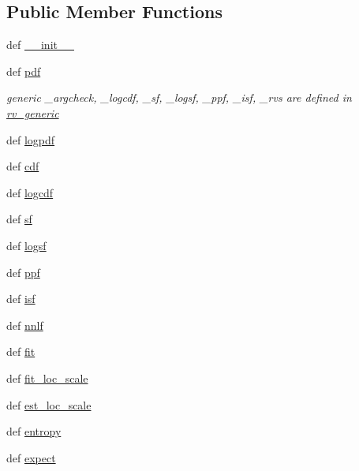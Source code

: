 \subsection*{Public Member Functions}
\begin{DoxyCompactItemize}
\item 
def \hyperlink{classscipy_1_1stats_1_1__distn__infrastructure_1_1rv__continuous_ae9e5e83021bde5995a7e33d878bd3164}{\+\_\+\+\_\+init\+\_\+\+\_\+}
\item 
def \hyperlink{classscipy_1_1stats_1_1__distn__infrastructure_1_1rv__continuous_a61a91f2c57f4d068af357900b68cf599}{pdf}
\begin{DoxyCompactList}\small\item\em generic \+\_\+argcheck, \+\_\+logcdf, \+\_\+sf, \+\_\+logsf, \+\_\+ppf, \+\_\+isf, \+\_\+rvs are defined in \hyperlink{classscipy_1_1stats_1_1__distn__infrastructure_1_1rv__generic}{rv\+\_\+generic} \end{DoxyCompactList}\item 
def \hyperlink{classscipy_1_1stats_1_1__distn__infrastructure_1_1rv__continuous_a2fbbb7dc6723af24f28e06a0ea6d4775}{logpdf}
\item 
def \hyperlink{classscipy_1_1stats_1_1__distn__infrastructure_1_1rv__continuous_a2e4b4d01e33cf98e78ae970208ce0201}{cdf}
\item 
def \hyperlink{classscipy_1_1stats_1_1__distn__infrastructure_1_1rv__continuous_ab231db44ff19bbc576960dbbcc5ac79a}{logcdf}
\item 
def \hyperlink{classscipy_1_1stats_1_1__distn__infrastructure_1_1rv__continuous_a9337de0dc7ffee8ee36cc2530a500091}{sf}
\item 
def \hyperlink{classscipy_1_1stats_1_1__distn__infrastructure_1_1rv__continuous_a50d1cd2313d81548bb60badf35bbd45a}{logsf}
\item 
def \hyperlink{classscipy_1_1stats_1_1__distn__infrastructure_1_1rv__continuous_a9b3e57e8b87c3fa6e88f95ab2602d531}{ppf}
\item 
def \hyperlink{classscipy_1_1stats_1_1__distn__infrastructure_1_1rv__continuous_a482c8634121e813d7c14d395f3ab9118}{isf}
\item 
def \hyperlink{classscipy_1_1stats_1_1__distn__infrastructure_1_1rv__continuous_ad1775ae173c3fe8dfee79507189ede35}{nnlf}
\item 
def \hyperlink{classscipy_1_1stats_1_1__distn__infrastructure_1_1rv__continuous_ac41d6ae016f5063450cd3c5f1ccadec9}{fit}
\item 
def \hyperlink{classscipy_1_1stats_1_1__distn__infrastructure_1_1rv__continuous_a7c9707ea7d6b69d5c3bdaace80c5b82f}{fit\+\_\+loc\+\_\+scale}
\item 
def \hyperlink{classscipy_1_1stats_1_1__distn__infrastructure_1_1rv__continuous_a976aa6995802d2cfcbf1d05f8030c02f}{est\+\_\+loc\+\_\+scale}
\item 
def \hyperlink{classscipy_1_1stats_1_1__distn__infrastructure_1_1rv__continuous_ac5c0578cdd7f30934ae38a9da4361ba1}{entropy}
\item 
def \hyperlink{classscipy_1_1stats_1_1__distn__infrastructure_1_1rv__continuous_aeeaa586017fda7dbe99067ff6e67b84c}{expect}
\end{DoxyCompactItemize}
